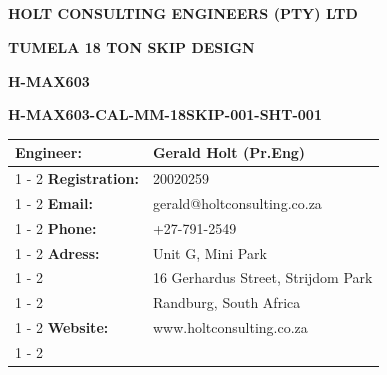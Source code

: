 \documentclass{article}%
\begin{document}
%
\pagestyle{empty}%
\normalsize%
\pagestyle{header}%
\begin{center}%
\section*{}%
\label{sec:}%
\begin{minipage}{\textwidth}%
\centering%
\begin{Large}%
\textbf{HOLT CONSULTING ENGINEERS (PTY) LTD}%
\end{Large}%
\vspace*{20pt}%
\linebreak%
\begin{large}%
\textbf{TUMELA 18 TON SKIP DESIGN}%
\end{large}%
\vspace*{20pt}%
\linebreak%
\begin{large}%
\textbf{H{-}MAX603}%
\end{large}%
\vspace*{20pt}%
\linebreak%
\begin{large}%
\textbf{H{-}MAX603{-}CAL{-}MM{-}18SKIP{-}001{-}SHT{-}001}%
\end{large}%
\vspace*{80pt}%
\end{minipage}

%
\end{center}%
\begin{center}%
\begin{minipage}{\textwidth}%
\flushleft%
\begin{tabular}{|l |l |}%
\hline%
\textbf{Engineer:}&Gerald Holt (Pr.Eng)\\%
\cline{1%
-%
2}%
\textbf{Registration:}&20020259\\%
\cline{1%
-%
2}%
\textbf{Email:}&gerald@holtconsulting.co.za\\%
\cline{1%
-%
2}%
\textbf{Phone:}&+27{-}791{-}2549\\%
\cline{1%
-%
2}%
\textbf{Adress:}&Unit G, Mini Park\\%
\cline{1%
-%
2}%
\textbf{}&16 Gerhardus Street, Strijdom Park\\%
\cline{1%
-%
2}%
\textbf{}&Randburg, South Africa\\%
\cline{1%
-%
2}%
\textbf{Website:}&www.holtconsulting.co.za\\%
\cline{1%
-%
2}%
\end{tabular}%
\vspace*{150pt}%
\centering%
\end{minipage}%
\end{center}%
\end{document}
